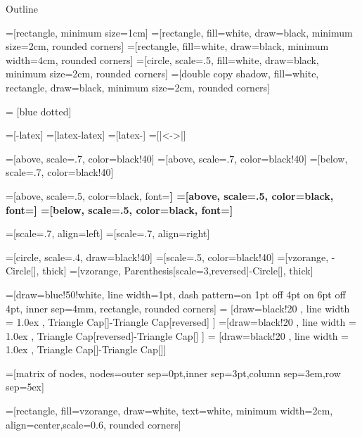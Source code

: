 \documentclass[smaller]{beamer}
\author{Vittorio Zaccaria}
\date{\today}
\title{}
\begin{document}
\begin{frame}{Outline}
\tableofcontents
\end{frame}

=[rectangle, minimum size=1cm]
=[rectangle, fill=white, draw=black, minimum size=2cm, rounded corners]
=[rectangle, fill=white, draw=black, minimum width=4cm, rounded corners]
=[circle, scale=.5, fill=white, draw=black, minimum size=2cm, rounded corners]
=[double copy shadow, fill=white, rectangle, draw=black, minimum size=2cm, rounded corners]

 = [blue dotted]

=[-latex]
=[latex-latex]
=[latex-]
=[|<->|]

     =[above, scale=.7, color=black!40]
=[above, scale=.7, color=black!40]
=[below, scale=.7, color=black!40]

     =[above, scale=.5, color=black, font=\ttfamily\bfseries]
=[above, scale=.5, color=black, font=\ttfamily\bfseries]
=[below, scale=.5, color=black, font=\ttfamily\bfseries]

      =[scale=.7, align=left]
     =[scale=.7, align=right]

=[circle, scale=.4, draw=black!40]
=[scale=.5, color=black!40]
=[vzorange, -{Circle[]}, thick]
=[vzorange, {Parenthesis[scale=3,reversed]}-{Circle[]}, thick]

=[draw=blue!50!white, line width=1pt, dash pattern=on 1pt off 4pt on 6pt off 4pt, inner sep=4mm, rectangle, rounded corners]
= [draw=black!20 , line width = 1.0ex , {Triangle Cap[]}-{Triangle Cap[reversed]} ]
=[draw=black!20 , line width = 1.0ex , {Triangle Cap[reversed]}-{Triangle Cap[]} ]
=   [draw=black!20 , line width = 1.0ex , {Triangle Cap[]}-{Triangle Cap[]}]

=[matrix of nodes, nodes={outer sep=0pt,inner sep=3pt},column sep=3em,row sep=5ex]

=[rectangle, fill=vzorange, draw=white, text=white, minimum width=2cm, align=center,scale=0.6, rounded corners]
\end{document}
